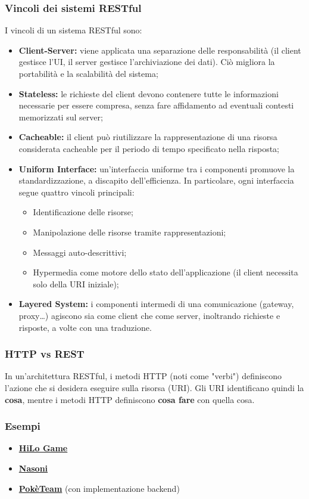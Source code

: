\documentclass[12pt]{article}
\begin{document}
\subsubsection{Vincoli dei sistemi RESTful}
I vincoli di un sistema RESTful sono:
\begin{itemize}
  \item \textbf{Client-Server:} viene applicata una separazione delle responsabilità (il client gestisce l'UI, il server gestisce l'archiviazione dei dati). Ciò migliora la portabilità e la scalabilità del sistema;
  \item \textbf{Stateless:} le richieste del client devono contenere tutte le informazioni necessarie per essere compresa, senza fare affidamento ad eventuali contesti memorizzati sul server;
  \item \textbf{Cacheable:} il client può riutilizzare la rappresentazione di una risorsa considerata cacheable per il periodo di tempo specificato nella risposta;
  \item \textbf{Uniform Interface:} un'interfaccia uniforme tra i componenti promuove la standardizzazione, a discapito dell'efficienza. In particolare, ogni interfaccia segue quattro vincoli principali:
    \begin{itemize}
      \item Identificazione delle risorse;
      \item Manipolazione delle risorse tramite rappresentazioni;
      \item Messaggi auto-descrittivi;
      \item Hypermedia come motore dello stato dell'applicazione (il client necessita solo della URI iniziale);
    \end{itemize}
  \item \textbf{Layered System:} i componenti intermedi di una comunicazione (gateway, proxy\dots) agiscono sia come client che come server, inoltrando richieste e risposte, a volte con una traduzione.
\end{itemize}

\subsubsection{HTTP vs REST}
In un'architettura RESTful, i metodi HTTP (noti come "verbi") definiscono l'azione che si desidera eseguire sulla risorsa (URI).
Gli URI identificano quindi la \textbf{cosa}, mentre i metodi HTTP definiscono \textbf{cosa fare} con quella cosa.

\subsubsection{Esempi}
\begin{itemize}
  \item \href{http://gamificationlab.uniroma1.it/notes/hilo-game-final.yaml}{\textbf{HiLo Game}}
  \item \href{https://github.com/Viquess/Appunti-UNI/blob/main/ProgrammazioneWEB/files/nasoni.yml}{\textbf{Nasoni}}
  \item \href{https://github.com/hide-ous/WASA/tree/master/server_design_first}{\textbf{PokèTeam}} (con implementazione backend)
\end{itemize}
\end{document}
